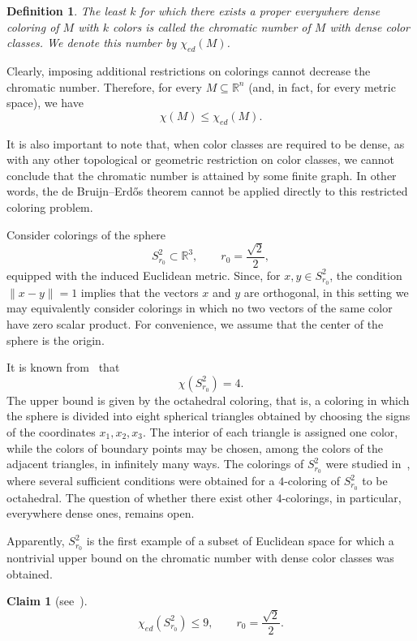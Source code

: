 \documentclass[12pt,a4paper]{article}
\newtheorem{claim}{Claim}
\newtheorem{definition}{Definition}
\begin{document}
\begin{definition}
The least $k$ for which there exists a proper everywhere dense coloring of
$M$ with $k$ colors is called the chromatic number of $M$ with
dense color classes. We denote this number by
$\chi_{ed}(M)$.
\end{definition}

Clearly, imposing additional restrictions on colorings cannot decrease the
chromatic number. Therefore, for every
$M\subseteq\mathbb{R}^n$ (and, in fact, for every metric space), we have
\[
\chi(M)\leq\chi_{ed}(M).
\]

It is also important to note that, when color classes are required to be
dense, as with any other topological or geometric restriction on
color classes, we cannot conclude that the chromatic number is attained by
some finite graph. In other words, the de Bruijn--Erdős theorem cannot be
applied directly to this restricted coloring problem.

Consider colorings of the sphere
\[
S^2_{r_0}\subset\mathbb{R}^3,\qquad r_0=\frac{\sqrt{2}}{2},
\]
equipped with the induced Euclidean metric. Since, for
$x,y\in S^2_{r_0}$, the condition $\|x-y\|=1$ implies that the vectors
$x$ and $y$ are orthogonal, in this setting we may equivalently consider
colorings in which no two vectors of the same color have zero scalar
product. For convenience, we assume that the center of the sphere is the
origin.

It is known from~\cite{kochen1967problem,simmons1976chromatic} that
\[
\chi(S^2_{r_0})=4.
\]
The upper bound is given by the octahedral coloring, that is, a coloring in
which the sphere is divided into eight spherical triangles obtained by
choosing the signs of the coordinates $x_1,x_2,x_3$. The interior of each
triangle is assigned one color, while the colors of boundary points may be
chosen, among the colors of the adjacent triangles, in infinitely many
ways. The colorings of $S^2_{r_0}$ were studied in~\cite{Holmsen16}, where
several sufficient conditions were obtained for a $4$-coloring of
$S^2_{r_0}$ to be octahedral. The question of whether there exist other
$4$-colorings, in particular, everywhere dense ones, remains open.

Apparently, $S^2_{r_0}$ is the first example of a subset of Euclidean space
for which a nontrivial upper bound on the chromatic number with
dense color classes was obtained.

\begin{claim}[see~\cite{Holmsen16}]
    \[
    \chi_{ed}(S^2_{r_0})\leq 9,\qquad
    r_0=\frac{\sqrt{2}}{2}.
    \]
\end{claim}
\end{document}
